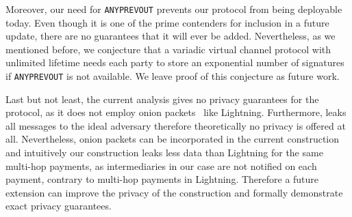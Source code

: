   Moreover, our need for \texttt{ANYPREVOUT} prevents our protocol from being
  deployable today. Even though it is one of the prime contenders for inclusion
  in a future update, there are no guarantees that it will ever be added.
  Nevertheless, as we mentioned before, we conjecture that a variadic virtual
  channel protocol with unlimited lifetime needs each party to store an
  exponential number of signatures if \texttt{ANYPREVOUT} is not available. We
  leave proof of this conjecture as future work.

  Last but not least, the current analysis gives no privacy guarantees for the
  protocol, as it does not employ onion packets~\cite{sphinx} like Lightning.
  Furthermore, \fchan leaks all messages to the ideal adversary therefore
  theoretically no privacy is offered at all. Nevertheless, onion packets can be
  incorporated in the current construction and intuitively our construction
  leaks less data than Lightning for the same multi-hop payments, as
  intermediaries in our case are not notified on each payment, contrary to
  multi-hop payments in Lightning. Therefore a future extension can improve the
  privacy of the construction and formally demonstrate exact privacy guarantees.

